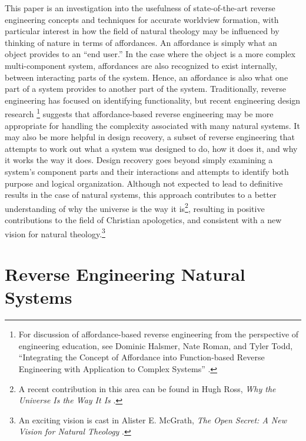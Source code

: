 This paper is an investigation into the usefulness of state-of-the-art
reverse engineering concepts and techniques for accurate worldview
formation, with particular interest in how the field of natural
theology may be influenced by thinking of nature in terms of
affordances. An affordance is simply what an object provides to an ``end
user.'' In the case where the object is a more complex multi-component
system, affordances are also recognized to exist internally, between
interacting parts of the system. Hence, an affordance is also what one
part of a system provides to another part of the system. Traditionally,
reverse engineering has focused on identifying functionality, but
recent engineering design research \citep[][pp. 34--37]{maier2008}\footnote{%
For
discussion of affordance-based reverse engineering from the perspective
of engineering education, see Dominic Halsmer, Nate Roman, and Tyler
Todd, “Integrating the Concept of Affordance into Function-based
Reverse Engineering with Application to Complex Systems” .
} suggests that
affordance-based reverse engineering may be more appropriate for
handling the complexity associated with many natural systems. It may
also be more helpful in design recovery, a subset of reverse
engineering that attempts to work out what a system was designed to do,
how it does it, and why it works the way it does.  Design recovery goes beyond simply
examining a system's component parts and their interactions and attempts to identify 
both purpose and logical organization. Although not
expected to lead to definitive results in the case of natural systems,
this approach contributes to a better understanding of why the universe
is the way it is\footnote{%
A recent contribution in this area can be found in
Hugh Ross, \textit{Why the Universe Is the Way It Is} \citep{ross2008}.
}, resulting in positive
contributions to the field of Christian apologetics, and consistent
with a new vision for natural theology.\footnote{%
An exciting vision is cast in Alister E. McGrath,
\textit{The Open Secret: A New Vision for Natural Theology} \citep{mcgrath2008}.
}

\section{Reverse Engineering Natural Systems}

